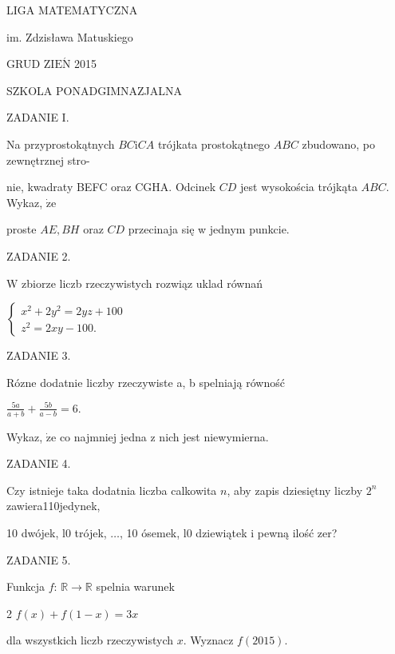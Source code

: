 \documentclass[a4paper,12pt]{article}
\begin{document}
LIGA MATEMATYCZNA

im. Zdzisława Matuskiego

GRUD Z$\mathrm{I}\mathrm{E}\acute{\mathrm{N}}$ 2015

SZKOLA PONADGIMNAZJALNA

ZADANIE I.

Na przyprostokątnych $BC\mathrm{i}CA$ trójkata prostokątnego $ABC$ zbudowano, po zewnętrznej stro-

nie, kwadraty BEFC oraz CGHA. Odcinek $CD$ jest wysokościa trójkąta $ABC$. Wykaz, $\dot{\mathrm{z}}\mathrm{e}$

proste $AE, BH$ oraz $CD$ przecinaja się w jednym punkcie.

ZADANIE 2.

$\mathrm{W}$ zbiorze liczb rzeczywistych rozwiąz uklad równań

$\left\{\begin{array}{l}
x^{2}+2y^{2}=2yz+100\\
z^{2}=2xy-100.
\end{array}\right.$

ZADANIE 3.

Rózne dodatnie liczby rzeczywiste a, b spelniają równość

$\displaystyle \frac{5a}{a+b}+\frac{5b}{a-b}=6.$

Wykaz, $\dot{\mathrm{z}}\mathrm{e}$ co najmniej jedna z nich jest niewymierna.

ZADANIE 4.

Czy istnieje taka dodatnia liczba calkowita $n$, aby zapis dziesiętny liczby $2^{n}$ zawiera110jedynek,

10 dwójek, l0 trójek, $\ldots$, 10 ósemek, l0 dziewiątek i pewną ilość zer?

ZADANIE 5.

Funkcja $f$: $\mathbb{R}\rightarrow \mathbb{R}$ spelnia warunek

2 $f(x)+f(1-x)=3x$

dla wszystkich liczb rzeczywistych $x$. Wyznacz $f(2015).$
\end{document}
